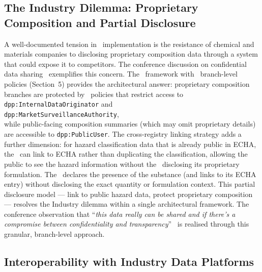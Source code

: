 \subsection{The Industry Dilemma: Proprietary Composition and Partial
Disclosure}

A well-documented tension in \DPP\ implementation is the resistance of chemical
and materials companies to disclosing proprietary composition data through a
system that could expose it to competitors. The conference discussion on
confidential data sharing~\cite{dpp4eu2026_day1} exemplifies this concern. The
\ABAC\ framework with \ODRL\ branch-level policies (Section~5) provides the
architectural answer: proprietary composition branches are protected by \ODRL\
policies that restrict access to
\\
\texttt{dpp:InternalDataOriginator} and 
\\
\texttt{dpp:MarketSurveillanceAuthority}, 
\\
while public-facing composition summaries (which may omit proprietary details)
are accessible to \texttt{dpp:PublicUser}. The cross-registry linking strategy
adds a further dimension: for hazard classification data that is already public
in ECHA, the \DPP\ can link to ECHA rather than duplicating the classification,
allowing the public to see the hazard information without the \REO\ disclosing
its proprietary formulation. The \REO\ declares the presence of the substance
(and links to its ECHA entry) without disclosing the exact quantity or
formulation context. This partial disclosure model --- link to public hazard
data, protect proprietary composition --- resolves the Industry dilemma within a
single architectural framework. The conference observation that ``\textit{this
data really can be shared and if there's a compromise between confidentiality
and transparency}''~\cite{dpp4eu2026_day1} is realised through this granular,
branch-level approach.

\subsection{Interoperability with Industry Data Platforms}

